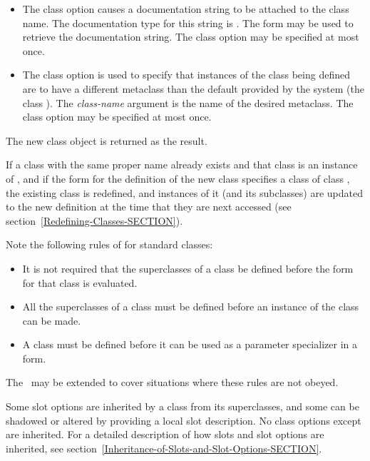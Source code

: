 \begin{defmac}
\begin{itemize}
\item  
The  class option causes a documentation string to be
attached to the class name.  The documentation type for this string is
.  The form 
may be used to retrieve the documentation string.  The 
 class option may be specified at most once.

\item 
The  class option is used to specify that instances of the
class being defined are to have a different metaclass than the default
provided by the system (the class ).  The \emph{class-name}
argument is the name of the desired metaclass.  The  
 class option may be specified at most once.
\end{itemize}

The new class object is returned as the result.

If a class with the same proper name already exists and that class is
an instance of , and if the  form for
the definition of the new class specifies a class of class 
, the existing class is redefined, and instances of it
(and its subclasses) are updated to the new definition at the time
that they are next accessed (see section~\ref{Redefining-Classes-SECTION}).

Note the following rules of  for standard classes:

\begin{itemize}

\item 
It is not required that the superclasses of a class be defined before
the  form for that class is evaluated.

\item 
All the superclasses of a class must be defined before 
an instance of the class can be made.

\item 
A class must be defined before it can be used as a parameter
specializer in a  form.
\end{itemize}

The \OS\ may be extended to cover situations where these rules are not
obeyed.

Some slot options are inherited by a class from its superclasses, and
some can be shadowed or altered by providing a local slot description.
No class options except  are inherited.  For a
detailed description of how slots and slot options are inherited, see
section~\ref{Inheritance-of-Slots-and-Slot-Options-SECTION}.


\end{defmac}
